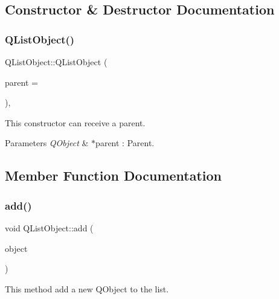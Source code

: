 \subsection{Constructor \& Destructor Documentation}
\mbox{\label{class_q_list_object_a035ee9dc9f035443995b9419d32b07da}} 
\subsubsection{\texorpdfstring{Q\+List\+Object()}{QListObject()}}
{\footnotesize\ttfamily Q\+List\+Object\+::\+Q\+List\+Object (\begin{DoxyParamCaption}\item[{Q\+Object $\ast$}]{parent = {} }\end{DoxyParamCaption})\hspace{0.3cm}{\ttfamily [inline]}, {\ttfamily [explicit]}}



This constructor can receive a parent. 


\begin{DoxyParams}{Parameters}
{\em Q\+Object} & $\ast$parent \+: Parent. \\
\hline
\end{DoxyParams}


\subsection{Member Function Documentation}
\mbox{\label{class_q_list_object_ad5e960eabd3e9b7d49228ea7549a9bd7}} 
\subsubsection{\texorpdfstring{add()}{add()}}
{\footnotesize\ttfamily void Q\+List\+Object\+::add (\begin{DoxyParamCaption}\item[{Q\+Object $\ast$}]{object }\end{DoxyParamCaption})\hspace{0.3cm}{\ttfamily [inline]}}



This method add a new Q\+Object to the list. 


